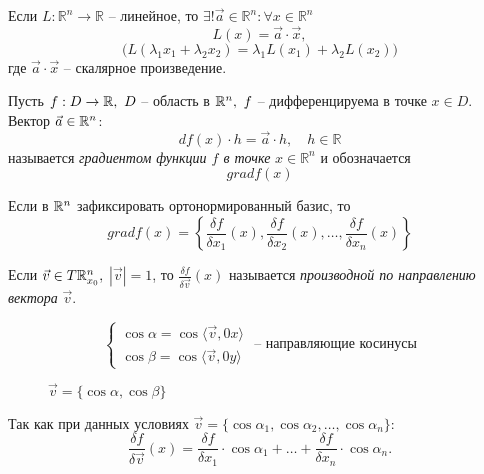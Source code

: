 \begin{statement}
    Если $L:\mathbb{R}^n \rightarrow \mathbb{R}$ -- линейное, то $\exists ! \vec{a}\in \mathbb{R}^n: \forall x \in \mathbb{R}^n$
    \[
        L(x) = \vec{a}\cdot \vec{x},
    \]
    \[
        \big(L(\lambda_1 x_1 + \lambda_2 x_2) = \lambda_1L(x_1) + \lambda_2 L(x_2)\big)
    \]
    где $\vec{a}\cdot \vec{x}$ -- скалярное произведение.
\end{statement}

\newpage

\begin{definition}
    Пусть $f:D\rightarrow \mathbb{R}, \ D$ -- область в $\mathbb{R}^n, \ f$ -- дифференцируема в точке $x \in D$. Вектор $\vec{a} \in \mathbb{R}^n$:
    \[
        df(x)\cdot h = \vec{a} \cdot h, \quad h \in \mathbb{R}
    \]
    называется \emph{градиентом функции $f$ в точке} $x \in \mathbb{R}^n$ и обозначается
    \[
        gradf(x)
    \]

    Если в $\mathbb{R}^n$ зафиксировать ортонормированный базис, то
    \[
        gradf(x) = \left\{\frac{\delta f}{\delta x_1}(x),\frac{\delta f}{\delta x_2}(x),\ldots,\frac{\delta f}{\delta x_n}(x)\right\}
    \]
\end{definition}

\begin{definition}
    Если $ \vec{v}\in T\mathbb{R}_{x_0}^n, $ $ |\vec{v}| = 1 $, то $ \frac{\delta f}{\delta \vec{v}}(x) $ называется \emph{производной по направлению вектора} $ \vec{v} $.
\end{definition}

\begin{example}
    \[
        \left\{\begin{array}{l}
            \cos\alpha = \cos\langle \vec{v},0x \rangle \\
            \cos\beta = \cos\langle \vec{v},0y \rangle
        \end{array}\right.\text{ -- направляющие косинусы}
    \]
    \begin{figure}[H]
        \centering
        \caption{$ \vec{v}=\{\cos\alpha,\cos\beta\} $}
        \label{fig:fig_01}
    \end{figure}

    Так как при данных условиях $ \vec{v} = \{\cos\alpha_1,\cos\alpha_2,\ldots,\cos\alpha_n\} $:
    \[
        \frac{\delta f}{\delta \vec{v}}(x)=\frac{\delta f}{\delta x_1}\cdot \cos\alpha_1 + \ldots + \frac{\delta f}{\delta x_n}\cdot \cos\alpha_n.
    \]
\end{example}

